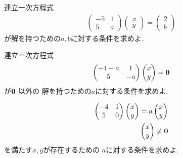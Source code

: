 \begin{quiz}
  連立一次方程式
  \begin{align*}
    \begin{pmatrix}-5&1\\5&a\end{pmatrix}
    \begin{pmatrix}x\\y\end{pmatrix}
      =
      \begin{pmatrix}2\\b\end{pmatrix}
  \end{align*}
  が解を持つための$a,b$に対する条件を求めよ.
\end{quiz}

\begin{quiz}
  \label{quiz:3:6}
  連立一次方程式
  \begin{align*}
    \begin{pmatrix}-4-a&1\\5&-a\end{pmatrix}
    \begin{pmatrix}x\\y\end{pmatrix}
      =
      \boldsymbol{0}
  \end{align*}
  が$\boldsymbol{0}$
  以外の
  解を持つための$a$に対する条件を求めよ.
\end{quiz}



\begin{quiz}
  \label{quiz:3:7}
  \begin{align*}
    \begin{pmatrix}-4&1\\5&0\end{pmatrix}
    \begin{pmatrix}x\\y\end{pmatrix}
      =
      a\begin{pmatrix}x\\y\end{pmatrix}\\
      \begin{pmatrix}x\\y\end{pmatrix}\neq \boldsymbol{0}
  \end{align*}
  を満たす$x,y$が存在するための
  $a$に対する条件を求めよ.
\end{quiz}





